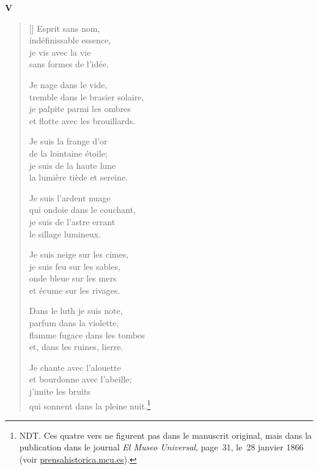 \documentclass[a4paper,12pt]{book}
\begin{document}
\bigskip

\begin{center}
  \textbf{V}
\end{center}

\settowidth{\versewidth}{que tapissent de blanches perles,}

\begin{verse}[\versewidth]
  Esprit sans nom, \\
  indéfinissable essence, \\
  je vis avec la vie \\
  sans formes de l'idée.

  Je nage dans le vide, \\
  tremble dans le brasier solaire, \\
  je palpite parmi les ombres \\
  et flotte avec les brouillards.

  Je suis la frange d'or \\
  de la lointaine étoile; \\
  je suis de la haute lune \\
  la lumière tiède et sereine.

  Je suis l'ardent nuage \\
  qui ondoie dans le couchant, \\
  je suis de l'astre errant \\
  le sillage lumineux.

  Je suis neige sur les cimes, \\
  je suis feu sur les sables, \\
  onde bleue sur les mers \\
  et écume sur les rivages.

  Dans le luth je suis note, \\
  parfum dans la violette, \\
  flamme fugace dans les tombes \\
  et, dans les ruines, lierre.

  Je chante avec l'alouette \\
  et bourdonne avec l'abeille; \\
  j'imite les bruits \\
  qui sonnent dans la pleine nuit.\footnote{NDT. Ces quatre vers ne
figurent pas dans le manuscrit original, mais dans la publication dans
le journal \emph{El Museo Universal}, page~31, le~28 janvier 1866 (voir \url{prensahistorica.mcu.es}).}


\end{verse}
\end{document}
